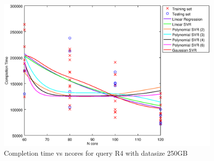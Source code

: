 
\begin {figure}[hbtp]
\centering
\includegraphics[width=\textwidth]{output/R4_250_ONLY_1_OVER_NCORES/plot_R4_250.eps}
\caption{Completion time vs ncores for query R4 with datasize 250GB}
\label{fig:all_nonlinear_R4_250}
\end {figure}
